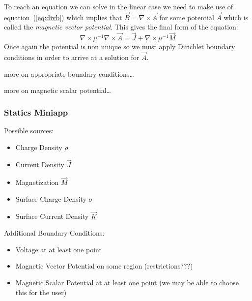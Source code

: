 \documentclass{article}
\newcommand{\refEq}[1]{(\ref{eq:#1})}
\newcommand{\Curl}{\nabla\!\times\!}
\begin{document}
To reach an equation we can solve in the linear case we need to make
use of equation~\refEq{divb} which implies that $\vec{B}=\Curl\vec{A}$
for some potential $\vec{A}$ which is called the {\em magnetic vector
  potential}.  This gives the final form of the equation:
\begin{equation}
\Curl\mu^{-1}\Curl\vec{A}=\vec{J}+\Curl\mu^{-1}\vec{M}
\end{equation}
Once again the potential is non unique so we must apply Dirichlet
boundary conditions in order to arrive at a solution for $\vec{A}$.   

more on appropriate boundary conditions\ldots

more on magnetic scalar potential\ldots

\subsubsection{Statics Miniapp}

Possible sources:
\begin{itemize}
\item Charge Density $\rho$
\item Current Density $\vec{J}$
\item Magnetization $\vec{M}$
\item Surface Charge Density $\sigma$
\item Surface Current Density $\vec{K}$
\end{itemize}

Additional Boundary Conditions:
\begin{itemize}
\item Voltage at at least one point
\item Magnetic Vector Potential on some region (restrictions???)
\item Magnetic Scalar Potential at at least one point (we may be able
  to choose this for the user)
\end{itemize}
\end{document}
